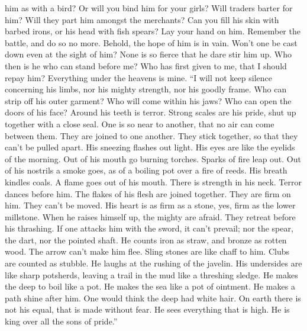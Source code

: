 him as with a bird? Or will you bind him for your girls? 
Will traders barter for him? Will they part him amongst the merchants?
 Can you fill his skin with barbed irons, or his head with
fish spears?  Lay your hand on him. Remember the battle,
and do so no more.  Behold, the hope of him is in vain.
Won't one be cast down even at the sight of him?  None is
so fierce that he dare stir him up. Who then is he who can stand before
me?  Who has first given to me, that I should repay him?
Everything under the heavens is mine.  ``I will not keep
silence concerning his limbs, nor his mighty strength, nor his goodly
frame.  Who can strip off his outer garment? Who will
come within his jaws?  Who can open the doors of his
face? Around his teeth is terror.  Strong scales are his
pride, shut up together with a close seal.  One is so
near to another, that no air can come between them.  They
are joined to one another. They stick together, so that they can't be
pulled apart.  His sneezing flashes out light. His eyes
are like the eyelids of the morning.  Out of his mouth go
burning torches. Sparks of fire leap out.  Out of his
nostrils a smoke goes, as of a boiling pot over a fire of reeds.
 His breath kindles coals. A flame goes out of his mouth.
 There is strength in his neck. Terror dances before him.
 The flakes of his flesh are joined together. They are
firm on him. They can't be moved.  His heart is as firm
as a stone, yes, firm as the lower millstone.  When he
raises himself up, the mighty are afraid. They retreat before his
thrashing.  If one attacks him with the sword, it can't
prevail; nor the spear, the dart, nor the pointed shaft. 
He counts iron as straw, and bronze as rotten wood.  The
arrow can't make him flee. Sling stones are like chaff to him.
 Clubs are counted as stubble. He laughs at the rushing
of the javelin.  His undersides are like sharp potsherds,
leaving a trail in the mud like a threshing sledge.  He
makes the deep to boil like a pot. He makes the sea like a pot of
ointment.  He makes a path shine after him. One would
think the deep had white hair.  On earth there is not his
equal, that is made without fear.  He sees everything
that is high. He is king over all the sons of pride.''

